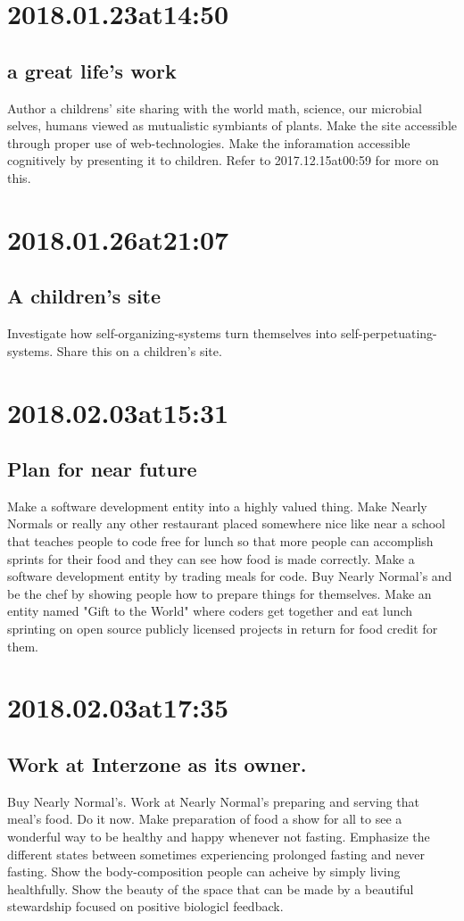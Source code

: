 \section*{ 2018.01.23at14:50 }
\subsection*{ a great life's work }
Author a childrens' site sharing with the world math, science, our microbial selves, humans viewed as mutualistic symbiants of plants. Make the site accessible through proper use of web-technologies. Make the inforamation accessible cognitively by presenting it to children. Refer to 2017.12.15at00:59 for more on this.

\section*{ 2018.01.26at21:07 }
\subsection*{ A children's site }
Investigate how self-organizing-systems turn themselves into self-perpetuating-systems.
Share this on a children's site.

\section*{ 2018.02.03at15:31 }
\subsection*{ Plan for near future }
Make a software development entity into a highly valued thing.
Make Nearly Normals or really any other restaurant placed somewhere nice like near a school that teaches people to code free for lunch so that more people can accomplish sprints for their food and they can see how food is made correctly.
Make a software development entity by trading meals for code.
Buy Nearly Normal's and be the chef by showing people how to prepare things for themselves.
Make an entity named "Gift to the World" where coders get together and eat lunch sprinting on open source publicly licensed projects in return for food credit for them.

\section*{ 2018.02.03at17:35 }
\subsection*{ Work at Interzone as its owner. }
Buy Nearly Normal's.
Work at Nearly Normal's preparing and serving that meal's food.
Do it now.
Make preparation of food a show for all to see a wonderful way to be healthy and happy whenever not fasting.
Emphasize the different states between sometimes experiencing prolonged fasting and never fasting. 
Show the body-composition people can acheive by simply living healthfully.
Show the beauty of the space that can be made by a beautiful stewardship focused on positive biologicl feedback.

